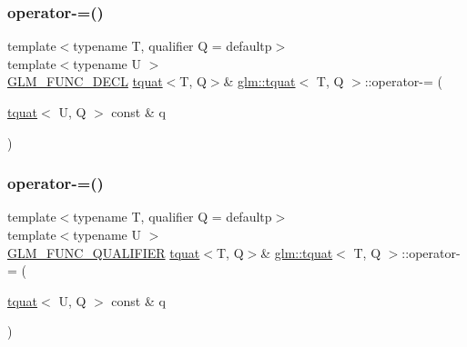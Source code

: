 \subsubsection{\texorpdfstring{operator-\/=()}{operator-=()}\hspace{0.1cm}{\footnotesize\ttfamily [1/2]}}
{\footnotesize\ttfamily template$<$typename T, qualifier Q = defaultp$>$ \\
template$<$typename U $>$ \\
\mbox{\hyperlink{setup_8hpp_ab2d052de21a70539923e9bcbf6e83a51}{G\+L\+M\+\_\+\+F\+U\+N\+C\+\_\+\+D\+E\+CL}} \mbox{\hyperlink{structglm_1_1tquat}{tquat}}$<$T, Q$>$\& \mbox{\hyperlink{structglm_1_1tquat}{glm\+::tquat}}$<$ T, Q $>$\+::operator-\/= (\begin{DoxyParamCaption}\item[{\mbox{\hyperlink{structglm_1_1tquat}{tquat}}$<$ U, Q $>$ const \&}]{q }\end{DoxyParamCaption})}

\mbox{\label{structglm_1_1tquat_a4b913cb3c700dfbe26207223690ac255}} 
\subsubsection{\texorpdfstring{operator-\/=()}{operator-=()}\hspace{0.1cm}{\footnotesize\ttfamily [2/2]}}
{\footnotesize\ttfamily template$<$typename T, qualifier Q = defaultp$>$ \\
template$<$typename U $>$ \\
\mbox{\hyperlink{setup_8hpp_a33fdea6f91c5f834105f7415e2a64407}{G\+L\+M\+\_\+\+F\+U\+N\+C\+\_\+\+Q\+U\+A\+L\+I\+F\+I\+ER}} \mbox{\hyperlink{structglm_1_1tquat}{tquat}}$<$T, Q$>$\& \mbox{\hyperlink{structglm_1_1tquat}{glm\+::tquat}}$<$ T, Q $>$\+::operator-\/= (\begin{DoxyParamCaption}\item[{\mbox{\hyperlink{structglm_1_1tquat}{tquat}}$<$ U, Q $>$ const \&}]{q }\end{DoxyParamCaption})}

\mbox{\label{structglm_1_1tquat_aed8e8a44af5bcae23e60b4ddc170e762}} 
